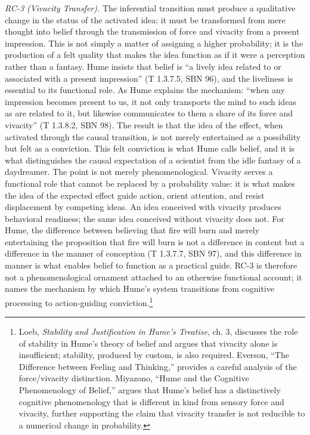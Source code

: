 \documentclass[11pt]{article}
\begin{document}
\emph{RC-3 (Vivacity Transfer).} The inferential transition must produce a qualitative change in the status of the activated idea: it must be transformed from mere thought into belief through the transmission of force and vivacity from a present impression. This is not simply a matter of assigning a higher probability; it is the production of a felt quality that makes the idea function as if it were a perception rather than a fantasy. Hume insists that belief is ``a lively idea related to or associated with a present impression'' (T 1.3.7.5, SBN 96), and the liveliness is essential to its functional role. As Hume explains the mechanism: ``when any impression becomes present to us, it not only transports the mind to such ideas as are related to it, but likewise communicates to them a share of its force and vivacity'' (T 1.3.8.2, SBN 98). The result is that the idea of the effect, when activated through the causal transition, is not merely entertained as a possibility but felt as a conviction. This felt conviction is what Hume calls belief, and it is what distinguishes the causal expectation of a scientist from the idle fantasy of a daydreamer. The point is not merely phenomenological. Vivacity serves a functional role that cannot be replaced by a probability value: it is what makes the idea of the expected effect guide action, orient attention, and resist displacement by competing ideas. An idea conceived with vivacity produces behavioral readiness; the same idea conceived without vivacity does not. For Hume, the difference between believing that fire will burn and merely entertaining the proposition that fire will burn is not a difference in content but a difference in the manner of conception (T 1.3.7.7, SBN 97), and this difference in manner is what enables belief to function as a practical guide. RC-3 is therefore not a phenomenological ornament attached to an otherwise functional account; it names the mechanism by which Hume's system transitions from cognitive processing to action-guiding conviction.\footnote{Loeb, \emph{Stability and Justification in Hume's Treatise}, ch. 3, discusses the role of stability in Hume's theory of belief and argues that vivacity alone is insufficient; stability, produced by custom, is also required. Everson, ``The Difference between Feeling and Thinking,'' provides a careful analysis of the force/vivacity distinction. Miyazono, ``Hume and the Cognitive Phenomenology of Belief,'' argues that Hume's belief has a distinctively cognitive phenomenology that is different in kind from sensory force and vivacity, further supporting the claim that vivacity transfer is not reducible to a numerical change in probability.}
\end{document}
